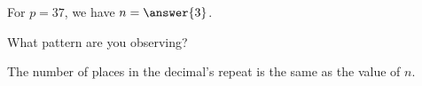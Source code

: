 \documentclass[nooutcomes]{ximera}
\begin{document}
\begin{problem}
\begin{problem}
\begin{problem}
\begin{prompt}
For $p=37$, we have $n=\answer{3}$.
\end{prompt}

What pattern are you observing?
\begin{freeResponse}
\begin{hint}
The number of places in the decimal's repeat is the same as the value of $n$.
\end{hint}
\end{freeResponse}
\end{problem}



\end{problem}



\end{problem}
\end{document}
